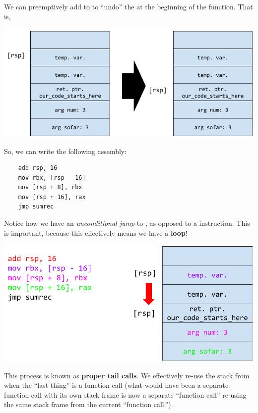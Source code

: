 We can preemptively add to  to ``undo'' the  at the beginning of the function. That is, 
\begin{center}
    \includegraphics[scale=0.5]{assets/tail_call_2.png}
\end{center}
So, we can write the following assembly:
\begin{verbatim}
    add rsp, 16 
    mov rbx, [rsp - 16]
    mov [rsp + 8], rbx 
    mov [rsp + 16], rax 
    jmp sumrec\end{verbatim}
Notice how we have an \emph{unconditional jump} to , as opposed to a  instruction. This is important, because this effectively means we have a \textbf{loop}!
\begin{center}
    \includegraphics[scale=0.4]{assets/tail_call_3.png}
\end{center}
This process is known as \textbf{proper tail calls}. We effectively re-use the stack from when the ``last thing'' is a function call (what would have been a separate function call with its own stack frame is now a separate ``function call'' re-using the same stack frame from the current ``function call.'').

